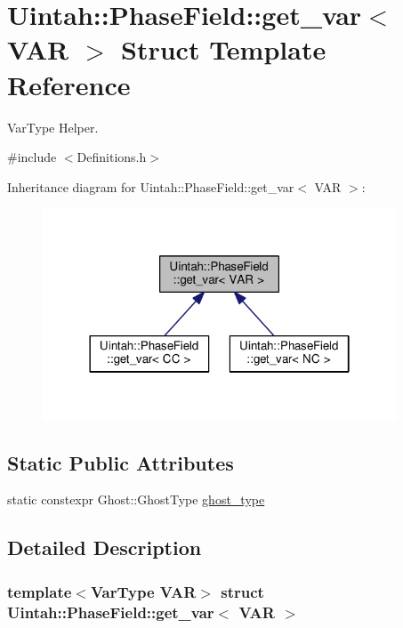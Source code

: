 \hypertarget{structUintah_1_1PhaseField_1_1get__var}{}\section{Uintah\+:\+:Phase\+Field\+:\+:get\+\_\+var$<$ V\+AR $>$ Struct Template Reference}
\label{structUintah_1_1PhaseField_1_1get__var}


Var\+Type Helper.  




{\ttfamily \#include $<$Definitions.\+h$>$}



Inheritance diagram for Uintah\+:\+:Phase\+Field\+:\+:get\+\_\+var$<$ V\+AR $>$\+:\nopagebreak
\begin{figure}[H]
\begin{center}
\leavevmode
\includegraphics[width=298pt]{structUintah_1_1PhaseField_1_1get__var__inherit__graph}
\end{center}
\end{figure}
\subsection*{Static Public Attributes}
\begin{DoxyCompactItemize}
\item 
static constexpr Ghost\+::\+Ghost\+Type \hyperlink{structUintah_1_1PhaseField_1_1get__var_a3896c2551eea0e63cd6315a6cff02bfd}{ghost\+\_\+type}
\end{DoxyCompactItemize}


\subsection{Detailed Description}
\subsubsection*{template$<$Var\+Type V\+AR$>$\newline
struct Uintah\+::\+Phase\+Field\+::get\+\_\+var$<$ V\+A\+R $>$}

